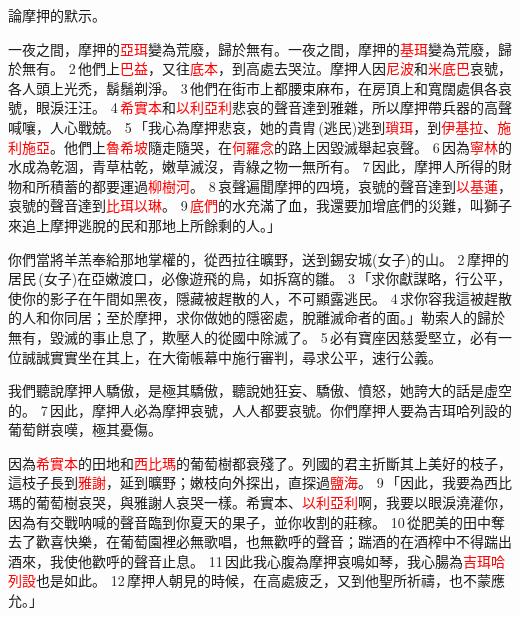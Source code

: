 論摩押的默示。

一夜之間，摩押的\textcolor{red}{亞珥}變為荒廢，歸於無有。一夜之間，摩押的\textcolor{red}{基珥}變為荒廢，歸於無有。 2 他們上\textcolor{red}{巴益}，又往\textcolor{red}{底本}，到高處去哭泣。摩押人因\textcolor{red}{尼波}和\textcolor{red}{米底巴}哀號，各人頭上光禿，鬍鬚剃淨。 3 他們在街市上都腰束麻布，在房頂上和寬闊處俱各哀號，眼淚汪汪。 4 \textcolor{red}{希實本}和\textcolor{red}{以利亞利}悲哀的聲音達到雅雜，所以摩押帶兵器的高聲喊嚷，人心戰兢。 5 「我心為摩押悲哀，她的貴胄 (逃民)逃到\textcolor{red}{瑣珥}，到\textcolor{red}{伊基拉}、\textcolor{red}{施利施亞}。他們上\textcolor{red}{魯希坡}隨走隨哭，在\textcolor{red}{何羅念}的路上因毀滅舉起哀聲。 6 因為\textcolor{red}{寧林}的水成為乾涸，青草枯乾，嫩草滅沒，青綠之物一無所有。 7 因此，摩押人所得的財物和所積蓄的都要運過\textcolor{red}{柳樹河}。 8 哀聲遍聞摩押的四境，哀號的聲音達到\textcolor{red}{以基蓮}，哀號的聲音達到\textcolor{red}{比珥以琳}。 9 \textcolor{red}{底們}的水充滿了血，我還要加增底們的災難，叫獅子來追上摩押逃脫的民和那地上所餘剩的人。」


你們當將羊羔奉給那地掌權的，從西拉往曠野，送到錫安城(女子)的山。 2 摩押的居民 (女子)在亞嫩渡口，必像遊飛的鳥，如拆窩的雛。 3 「求你獻謀略，行公平，使你的影子在午間如黑夜，隱藏被趕散的人，不可顯露逃民。 4 求你容我這被趕散的人和你同居；至於摩押，求你做她的隱密處，脫離滅命者的面。」勒索人的歸於無有，毀滅的事止息了，欺壓人的從國中除滅了。 5 必有寶座因慈愛堅立，必有一位誠誠實實坐在其上，在大衛帳幕中施行審判，尋求公平，速行公義。

我們聽說摩押人驕傲，是極其驕傲，聽說她狂妄、驕傲、憤怒，她誇大的話是虛空的。 7 因此，摩押人必為摩押哀號，人人都要哀號。你們摩押人要為吉珥哈列設的葡萄餅哀嘆，極其憂傷。

因為\textcolor{red}{希實本}的田地和\textcolor{red}{西比瑪}的葡萄樹都衰殘了。列國的君主折斷其上美好的枝子，這枝子長到\textcolor{red}{雅謝}，延到曠野；嫩枝向外探出，直探過\textcolor{red}{鹽海}。 9 「因此，我要為西比瑪的葡萄樹哀哭，與雅謝人哀哭一樣。希實本、\textcolor{red}{以利亞利}啊，我要以眼淚澆灌你，因為有交戰呐喊的聲音臨到你夏天的果子，並你收割的莊稼。 10 從肥美的田中奪去了歡喜快樂，在葡萄園裡必無歌唱，也無歡呼的聲音；踹酒的在酒榨中不得踹出酒來，我使他歡呼的聲音止息。 11 因此我心腹為摩押哀鳴如琴，我心腸為\textcolor{red}{吉珥哈列設}也是如此。 12 摩押人朝見的時候，在高處疲乏，又到他聖所祈禱，也不蒙應允。」

